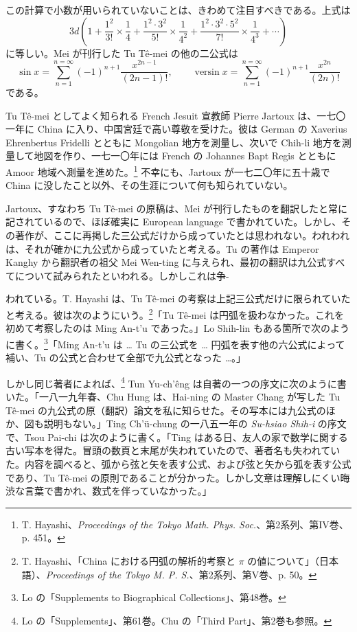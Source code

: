 \documentclass[11pt]{article}
\newcommand{\scanpage}[2]{\clearpage\setcounter{footnote}{0}\noindent{\footnotesize\color{gray}PDF #1 頁 · #2}\par\medskip}
\newcommand{\scanfooter}{}
\newcommand{\versin}{\mathop{\mathrm{versin}}}
\begin{document}
この計算で小数が用いられていないことは、きわめて注目すべきである。上式は
\[
3d\left(1+\frac{1^2}{3!}\times\frac14
+\frac{1^2\cdot3^2}{5!}\times\frac1{4^2}
+\frac{1^2\cdot3^2\cdot5^2}{7!}\times\frac1{4^3}+\cdots\right)
\]
に等しい。Mei が刊行した Tu Tê-mei の他の二公式は
\[
\sin x=\sum_{n=1}^{n=\infty}(-1)^{n+1}\frac{x^{2n-1}}{(2n-1)!},
\qquad
\versin x=\sum_{n=1}^{n=\infty}(-1)^{n+1}\frac{x^{2n}}{(2n)!}
\]
である。

Tu Tê-mei としてよく知られる French Jesuit 宣教師 Pierre Jartoux は、一七〇一年に China に入り、中国宮廷で高い尊敬を受けた。彼は German の Xaverius Ehrenbertus Fridelli とともに Mongolian 地方を測量し、次いで Chih-li 地方を測量して地図を作り、一七一〇年には French の Johannes Bapt Regis とともに Amoor 地域へ測量を進めた。\footnote{T. Hayashi、\emph{Proceedings of the Tokyo Math. Phys. Soc.}、第2系列、第IV巻、p. 451。} 不幸にも、Jartoux が一七二〇年に五十歳で China に没したこと以外、その生涯について何も知られていない。

Jartoux、すなわち Tu Tê-mei の原稿は、Mei が刊行したものを翻訳したと常に記されているので、ほぼ確実に European language で書かれていた。しかし、その著作が、ここに再掲した三公式だけから成っていたとは思われない。われわれは、それが確かに九公式から成っていたと考える。Tu の著作は Emperor Kanghy から翻訳者の祖父 Mei Wen-ting に与えられ、最初の翻訳は九公式すべてについて試みられたといわれる。しかしこれは争-
\scanfooter

\scanpage{0158}{第21章、印刷頁144}
われている。T. Hayashi は、Tu Tê-mei の考察は上記三公式だけに限られていたと考える。彼は次のようにいう。\footnote{T. Hayashi、「China における円弧の解析的考察と $\pi$ の値について」（日本語）、\emph{Proceedings of the Tokyo M. P. S.}、第2系列、第V巻、p. 50。}「Tu Tê-mei は円弧を扱わなかった。これを初めて考察したのは Ming An-t'u であった。」Lo Shih-lin もある箇所で次のように書く。\footnote{Lo の「Supplements to Biographical Collections」、第48巻。}「Ming An-t'u は \ldots{} Tu の三公式を \ldots{} 円弧を表す他の六公式によって補い、Tu の公式と合わせて全部で九公式となった \ldots{}。」

しかし同じ著者によれば、\footnote{Lo の「Supplements」、第61巻。Chu の「Third Part」、第2巻も参照。} Tun Yu-ch'êng は自著の一つの序文に次のように書いた。「一八一九年春、Chu Hung は、Hai-ning の Master Chang が写した Tu Tê-mei の九公式の原（翻訳）論文を私に知らせた。その写本には九公式のほか、図も説明もない。」Ting Ch'ü-chung の一八五一年の \emph{Su-hsiao Shih-i} の序文で、Tsou Pai-chi は次のように書く。「Ting はある日、友人の家で数学に関する古い写本を得た。冒頭の数頁と末尾が失われていたので、著者名も失われていた。内容を調べると、弧から弦と矢を表す公式、および弦と矢から弧を表す公式であり、Tu Tê-mei の原則であることが分かった。しかし文章は理解しにくい晦渋な言葉で書かれ、数式を伴っていなかった。」
\end{document}
